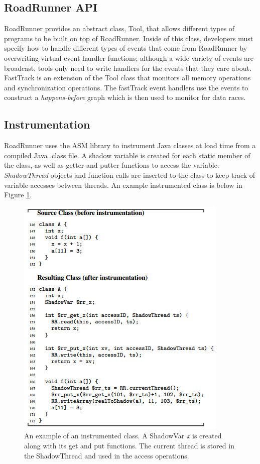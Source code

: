 \documentclass{acm_proc_article-sp}
\begin{document}
\subsection{RoadRunner API}
RoadRunner provides an abstract class, Tool, that allows different types of programs to be built on top of RoadRunner. Inside of this class, developers must specify how to handle different types of events that come from RoadRunner by overwriting virtual event handler functions; although a wide variety of events are broadcast, tools only need to write handlers for the events that they care about. FastTrack is an extension of the Tool class that monitors all memory operations and synchronization operations. The fastTrack event handlers use the events to construct a \emph{happens-before} graph which is then used to monitor for data races.


\subsection{Instrumentation}
RoadRunner uses the ASM \cite{Bruneton02} library to instrument Java classes at load time from a compiled Java .class file. A shadow variable is created for each static member of the class, as well as getter and putter functions to access the variable. \emph{ShadowThread} objects and function calls are inserted to the class to keep track of variable accesses between threads. An example instrumented class is below in Figure \ref{instrumentation}.
  \begin{figure}[h]
    \centering
      \includegraphics[scale=.5]{instrumentatin_new}
      \caption{An example of an instrumented class. A ShadowVar \emph{x} is created along with its get and put functions. The current thread is stored in the ShadowThread and used in the access operations.\label{instrumentation}}
  \end{figure}
\end{document}
